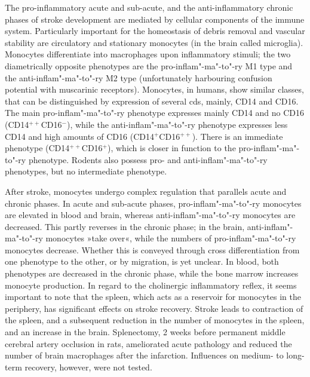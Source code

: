 The pro-inflammatory acute and sub-acute, and the anti-inflammatory chronic phases of stroke development are mediated by cellular components of the immune system. Particularly important for the homeostasis of debris removal and vascular stability are circulatory and stationary monocytes (in the brain called microglia).\cite{ElAli2016} Monocytes differentiate into macrophages upon inflammatory stimuli; the two diametrically opposite phenotypes are the pro-inflam"-ma"-to"-ry M1 type and the anti-inflam"-ma"-to"-ry M2 type (unfortunately harbouring confusion potential with muscarinic receptors). Monocytes, in humans, show similar classes, that can be distinguished by expression of several \acp{cd}, mainly, CD14 and CD16. The main pro-inflam"-ma"-to"-ry phenotype expresses mainly CD14 and no CD16 (CD14$^{++}$CD16$^{-}$), while the anti-inflam"-ma"-to"-ry phenotype expresses less CD14 and high amounts of CD16 (CD14$^{+}$CD16$^{++}$). There is an immediate phenotype (CD14$^{++}$CD16$^{+}$), which is closer in function to the pro-inflam"-ma"-to"-ry phenotype. Rodents also possess pro- and anti-inflam"-ma"-to"-ry phenotypes, but no intermediate phenotype.\cite{ElAli2016}

After stroke, monocytes undergo complex regulation that parallels acute and chronic phases. In acute and sub-acute phases, pro-inflam"-ma"-to"-ry monocytes are elevated in blood and brain, whereas anti-inflam"-ma"-to"-ry monocytes are decreased. This partly reverses in the chronic phase; in the brain, anti-inflam"-ma"-to"-ry monocytes »take over«, while the numbers of pro-inflam"-ma"-to"-ry monocytes decrease. Whether this is conveyed through cross differentiation from one phenotype to the other, or by migration, is yet unclear.\cite{ElAli2016} In blood, both phenotypes are decreased in the chronic phase, while the bone marrow increases monocyte production. In regard to the cholinergic inflammatory reflex, it seems important to note that the spleen, which acts as a reservoir for monocytes in the periphery,\cite{Swirski2009} has significant effects on stroke recovery. Stroke leads to contraction of the spleen, and a subsequent reduction in the number of monocytes in the spleen, and an increase in the brain.\cite{Kim2014} Splenectomy, 2 weeks before permanent middle cerebral artery occlusion in rats, ameliorated acute pathology and reduced the number of brain macrophages after the infarction.\cite{Ajmo2008} Influences on medium- to long-term recovery, however, were not tested.

